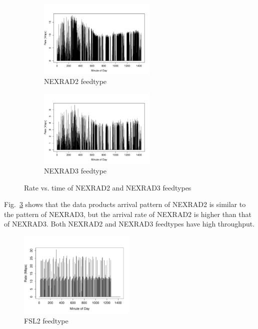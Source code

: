 \begin{figure}[htb!]
\centering
    \begin{subfigure}{0.5\linewidth}
        \centering
        \includegraphics[width=2.2in]{figures/rate_time_NEXRAD20602.pdf}
        \caption{NEXRAD2 feedtype}
        \label{fig:N2-rate}
    \end{subfigure}\hfill
    \begin{subfigure}{0.5\linewidth}
	\centering
    \includegraphics[width=2.2in]{figures/rate_time_NEXRAD30602.pdf}
        \caption{NEXRAD3 feedtype}
        \label{fig:N3-rate}
    \end{subfigure}\hfill
    \caption{Rate vs. time of NEXRAD2 and NEXRAD3 feedtypes}
    \label{NEXRAD-rate}
\end{figure}

Fig.~\ref{NEXRAD-rate} shows that the data products arrival pattern of NEXRAD2 is similar to the pattern of NEXRAD3, but the arrival rate of NEXRAD2 is higher than that of NEXRAD3. Both NEXRAD2 and NEXRAD3 feedtypes have high throughput. 


\begin{figure}[htb!]
\centering
\includegraphics[width=2.2in]{figures/rate_time_FSL20602.pdf}
\caption{FSL2 feedtype}
\label{fig:FSL2-rate}
\end{figure}

